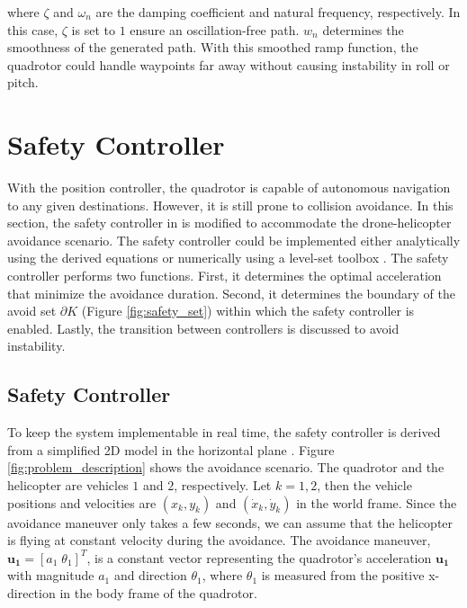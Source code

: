 \documentclass[journal,11pt,onecolumn,draftclsnofoot,]{IEEEtran}
\begin{document}
where $\zeta$ and $\omega_n$ are the damping coefficient and natural frequency, respectively. In this case, $\zeta$ is set to $1$ ensure an oscillation-free path. $w_n$ determines the smoothness of the generated path. With this smoothed ramp function, the quadrotor could handle waypoints far away without causing instability in roll or pitch.

\section{\textbf{Safety Controller}}

With the position controller, the quadrotor is capable of autonomous navigation to any given destinations. However, it is still prone to collision avoidance. In this section, the safety controller in \cite{hoffmann2008decentralized} is modified to accommodate the drone-helicopter avoidance scenario. The safety controller could be implemented either analytically using the derived equations or numerically using a level-set toolbox \cite{mitchell2004toolbox, chu2008level}. The safety controller performs two functions. First, it determines the optimal acceleration that minimize the avoidance duration. Second, it determines the boundary of the avoid set $\partial K$ (Figure \ref{fig:safety_set}) within which the safety controller is enabled. Lastly, the transition between controllers is discussed to avoid instability.

\subsection{Safety Controller} \label{sec:safety_controller_derivation}
To keep the system implementable in real time, the safety controller is derived from a simplified 2D model in the horizontal plane \cite{hoffmann2008decentralized}. Figure \ref{fig:problem_description} shows the avoidance scenario. The quadrotor and the helicopter are vehicles $1$ and $2$, respectively. Let $k={1,2}$, then the vehicle positions and velocities are $(x_k,y_k )$ and $(\dot{x}_k,\dot{y}_k )$ in the world frame. Since the avoidance maneuver only takes a few seconds, we can assume that the helicopter is flying at constant velocity during the avoidance. The avoidance maneuver, $\boldsymbol{u_1}=[a_1 \; \theta_1 ]^T$, is a constant vector representing the quadrotor's acceleration $\boldsymbol{u_1}$ with magnitude $a_1$ and direction $\theta_1$, where $\theta_1$ is measured from the positive x-direction in the body frame of the quadrotor.
\end{document}

